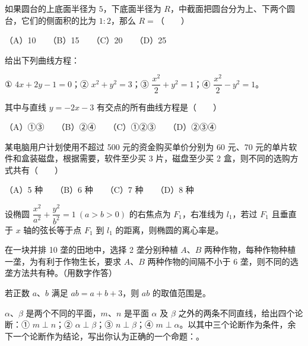 \begin{question}
如果圆台的上底面半径为 $5$，下底面半径为 $R$，中截面把圆台分为上、下两个圆台，它们的侧面积的比为 $1:2$，那么 $R=$\mbox{（　　）}

（A）10　　（B）15　　（C）20　　（D）25

\end{question}
\begin{question}
给出下列曲线方程：

① $4x+2y-1=0$；② $x^2+y^2=3$；③ $\dfrac{x^2}{2}+y^2=1$；④ $\dfrac{x^2}{2}-y^2=1$。

其中与直线 $y=-2x-3$ 有交点的所有曲线方程是\mbox{（　　）}

（A）①③　　（B）②④　　（C）①②③　　（D）②③④

\end{question}
\begin{question}
某电脑用户计划使用不超过 500 元的资金购买单价分别为 60 元、70 元的单片软件和盒装磁盘，根据需要，软件至少买 3 片，磁盘至少买 2 盒，则不同的选购方式共有\mbox{（　　）}

（A）5 种　　（B）6 种　　（C）7 种　　（D）8 种

\end{question}
\begin{question}
设椭圆 $\dfrac{x^2}{a^2}+\dfrac{y^2}{b^2}=1\ (a>b>0)$ 的右焦点为 $F_1$，右准线为 $l_1$，若过 $F_1$ 且垂直于 $x$ 轴的弦长等于点 $F_1$ 到 $l_1$ 的距离，则椭圆的离心率是\gkblank{}。

\end{question}
\begin{question}
在一块并排 10 垄的田地中，选择 2 垄分别种植 $A$、$B$ 两种作物，每种作物种植一垄，为有利于作物生长，要求 $A$、$B$ 两种作物的间隔不小于 6 垄，则不同的选垄方法共有\gkblank{}种。（用数字作答）

\end{question}
\begin{question}
若正数 $a$、$b$ 满足 $ab=a+b+3$，则 $ab$ 的取值范围是\gkblank{}。

\end{question}
\begin{question}
$\alpha$、$\beta$ 是两个不同的平面，$m$、$n$ 是平面 $\alpha$ 及 $\beta$ 之外的两条不同直线，给出四个论断：① $m\perp n$；② $\alpha\perp\beta$；③ $n\perp\beta$；④ $m\perp\alpha$。以其中三个论断作为条件，余下一个论断作为结论，写出你认为正确的一个命题：\gkblank{}。

\end{question}
